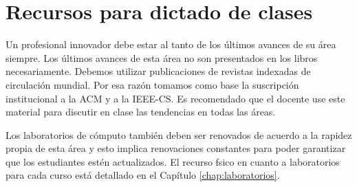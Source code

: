 \section{Recursos para dictado de clases}\label{sec:resources-to-teach}
Un profesional innovador debe estar al tanto de los últimos avances de su área siempre. Los últimos avances de esta área no son presentados en los libros necesariamente. Debemos utilizar publicaciones de revistas indexadas de circulación mundial. Por esa razón tomamos como base la suscripción institucional a la ACM y a la IEEE-CS. Es recomendado que el docente use este material para discutir en clase las tendencias en todas las áreas.

Los laboratorios de cómputo también deben ser renovados de acuerdo a la rapidez
propia de esta área y esto implica renovaciones constantes para poder garantizar
que los estudiantes estén actualizados.
El recurso f­sico en cuanto a laboratorios para cada curso está detallado en el Capí­tulo \ref{chap:laboratorios}.
